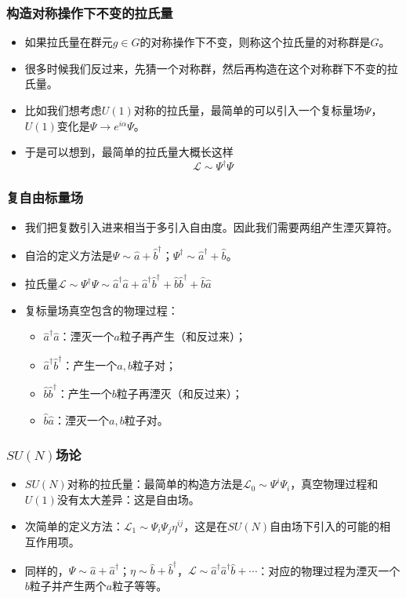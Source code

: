 \documentclass[CJK]{beamer}
\newcommand{\lag}{\mathcal{L}}
\begin{document}
\begin{frame}
\frametitle{\bch 构造对称操作下不变的拉氏量 \ech}
\bch
\begin{itemize}
\item 如果拉氏量在群元$g\in G$的对称操作下不变，则称这个拉氏量的对称群是$G$。
\item 很多时候我们反过来，先猜一个对称群，然后再构造在这个对称群下不变的拉氏量。
\item 比如我们想考虑$U(1)$对称的拉氏量，最简单的可以引入一个复标量场$\varPsi$，$U(1)$变化是$\varPsi \to e^{i\alpha} \varPsi$。
\item 于是可以想到，最简单的拉氏量大概长这样
$$
\lag \sim \varPsi^\dagger \varPsi
$$
\end{itemize}
\ech
\end{frame}

\begin{frame}
\frametitle{\bch 复自由标量场 \ech}
\bch
\begin{itemize}
\item 我们把复数引入进来相当于多引入自由度。因此我们需要两组产生湮灭算符。
\item 自洽的定义方法是$\varPsi \sim \hat a + \hat b^\dagger$；$\varPsi^\dagger \sim \hat a^\dagger + \hat b$。
\item 拉氏量$\lag \sim \varPsi^\dagger \varPsi \sim \hat a^\dagger \hat a + \hat a^\dagger \hat b^\dagger + \hat b \hat b^\dagger + \hat b\hat a$
\item 复标量场真空包含的物理过程：
\begin{itemize}
\item 
$\hat a^\dagger \hat a $：湮灭一个$a$粒子再产生（和反过来）；
\item
$ \hat a^\dagger \hat b^\dagger$：产生一个$a,b$粒子对；
\item
$ \hat b \hat b^\dagger$：产生一个$b$粒子再湮灭（和反过来）；
\item
$\hat b\hat a$：湮灭一个$a,b$粒子对。
\end{itemize}
\end{itemize}
\ech
\end{frame}

\begin{frame}
\frametitle{\bch $SU(N)$场论 \ech}
\bch
\begin{itemize}
\item $SU(N)$对称的拉氏量：最简单的构造方法是$\lag_0 \sim \varPsi^i \varPsi_i$，真空物理过程和$U(1)$没有太大差异：这是自由场。
\item 次简单的定义方法：$\lag_1 \sim \varPsi_i \varPsi_j \eta^{ij}$，这是在$SU(N)$自由场下引入的可能的相互作用项。
\item 同样的，$\varPsi \sim \hat a + \hat a^\dagger$；$\eta \sim \hat b + \hat b^\dagger$，$\lag \sim \hat a^\dagger \hat a^\dagger \hat b + \cdots$：对应的物理过程为湮灭一个$b$粒子并产生两个$a$粒子等等。
\end{itemize}
\ech
\end{frame}
\end{document}
